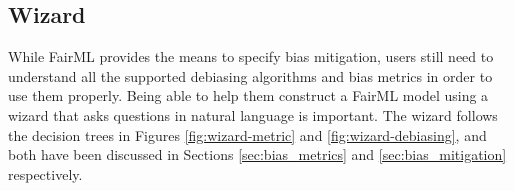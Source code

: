 \documentclass[sigconf]{acmart}
\begin{document}
{		%
		
		\subsection{Wizard}
		\label{sec:wizard}
		While FairML provides the means to specify bias mitigation, users still need to understand all the supported debiasing algorithms and bias metrics in order to use them properly. Being able to help them construct a FairML model using a wizard that asks questions in natural language is important. The wizard follows the decision trees in Figures \ref{fig:wizard-metric} and \ref{fig:wizard-debiasing}, and both have been discussed in Sections \ref{sec:bias_metrics} and \ref{sec:bias_mitigation} respectively.
	
}
\end{document}
